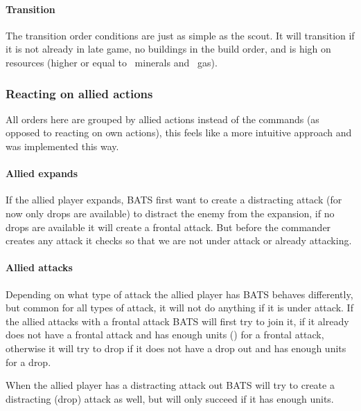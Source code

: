 \paragraph{Transition}
The transition order conditions are just as simple as the scout. It will transition if it is not
already in late game, no buildings in the build order, and is high on resources (higher or equal to
\classificationHighOnMinerals~minerals and \classificationHighOnGas~gas).

\subsubsection{Reacting on allied actions} All orders here are grouped by allied actions instead of
the commands (as opposed to reacting on own actions), this feels like a more intuitive approach and
was implemented this way.

\paragraph{Allied expands} If the allied player expands, BATS first want to create a distracting
attack (for now only drops are available) to distract the enemy from the expansion, if no drops are
available it will create a frontal attack. But before the commander creates any attack it checks so
that we are not under attack or already attacking.

\paragraph{Allied attacks} Depending on what type of attack the allied player has BATS behaves
differently, but common for all types of attack, it will not do anything if it is under attack. If
the allied attacks with a frontal attack BATS will first try to join it, if it already does not have
a frontal attack and has enough units (\classificationFrontalAttackUnitsMin) for a frontal attack,
otherwise it will try to drop if it does not have a drop out and has enough units for a drop.

When the allied player has a distracting attack out BATS will try to create a distracting (drop)
attack as well, but will only succeed if it has enough units.
